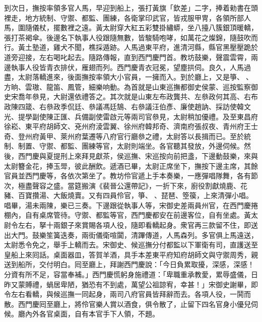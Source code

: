 到次日，撫按率領多官人馬，早迎到船上，張打黃旗「欽差」二字，捧着勑書在頭裡走，地方統制、守禦、都監、團練，各衛掌印武官，皆戎服甲冑，各領所部人馬，圍隨儀杖，擺數裡之遠。黃太尉穿大紅五彩雙掛繡蟒，坐八擡八簇銀頂暖轎，張打茶褐傘。後邊名下執事人役跟隨無數，皆駿騎咆哮，如萬花之燦錦，隨鼓吹而行。黃土塾道，雞犬不聞，樵採遁跡。人馬過東平府，進清河縣，縣官黑壓壓跪於道旁迎接，左右喝叱起去。隨路傳報，直到西門慶門首。教坊鼓樂，聲震雲霄，兩邊執事人役皆青衣排伏，雁翅而列。西門慶青衣冠冕，望塵拱伺。{}良久，人馬過盡，太尉落轎進來，後面撫按率領大小官員，一擁而入。到於廳上，又是箏、𥱧、方晌、雲璈、龍笛、鳳管，細樂响動。為首就是山東巡撫都御史侯蒙、巡按監察御史宋喬年叅見，大尉還依禮答之。其次就是山東左布政龔共、左叅政何其高、右布政陳四箴、右叅政季侃廷、叅議馮廷鵠、右叅議汪伯彥、廉使趙訥、採訪使韓文光、提學副使陳正匯、兵備副使雷啟元等兩司官叅見，太尉稍加優禮。及至東昌府徐崧、東平府胡師文、兗州府淩雲翼、徐州府韓邦奇、濟南府張叔夜、青州府王士奇、登州府黃甲、萊州府葉遷等八府官行廳叅之禮，太尉答以長揖而已。至於統制、制置、守禦、都監、團練等官，太尉則端坐。各官聽其發放，外邊伺候。然後，西門慶與夏提刑上來拜見獻茶，{}侯巡撫、宋巡按向前把盞，下邊動鼓樂，來與太尉簪金花，捧玉斝，彼此酬飲。遞酒已畢，太尉正席坐下，撫按下邊主席，其餘官員並西門慶等，各依次第坐了。教坊伶官遞上手本奏樂，一應彈唱隊舞，各有節次，極盡聲容之盛。當筵搬演《裴晉公還帶記》，一折下來，廚役割獻燒鹿、花豬、百寶攢湯、大飯燒賣。又有四員伶官，箏、𥱧、琵琶、箜篌，上來清彈小唱。唱畢，湯未兩陳，樂已三奏。下邊跟從執事人等，宋御史差兩員州官，在西門慶捲棚內，自有桌席管待。守禦、都監等官，西門慶都安在前邊客位，自有坐處。黃太尉令左右，拏十兩銀子來賞賜各項人役，隨即看轎起身。衆官再三款留不住，即送出大門。鼓樂笙簧迭奏，兩街儀衛喧闐，清蹕傳道，人馬森列。多官俱上馬遠送，太尉悉令免之，舉手上轎而去。{}宋御史、候巡撫分付都監以下軍衛有司，直護送至皇船上來囘話。桌面器皿，答賀羊酒，具手本差東平府知府胡師文與守禦周秀，親送到船所，交付明白。囘至廳上，拜謝西門慶說：「今日負累取擾，深感，深感！分資有所不足，容當奉補。」西門慶慌躬身施禮道：「卑職重承教愛，累辱盛儀，日昨又蒙賻禮，蝸居卑陋，猶恐有不到處，萬望公祖諒宥，幸甚！」宋御史謝畢，即令左右看轎，與候巡撫一同起身，兩司八府官員皆拜辭而去。各項人役，一鬨而散。西門慶囘至廳上，將伶官樂人賞以酒食，俱令散了，止留下四名官身小優兒伺候。廳內外各官桌面，自有本官手下人領，{}不題。

